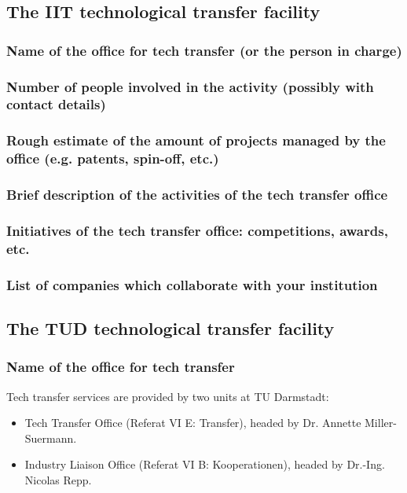 \documentclass[12pt,a4paper,twoside]{article}
\begin{document}
\subsection{The IIT technological transfer facility}

\subsubsection{Name of the office for tech transfer (or the person in charge)}
\subsubsection{Number of people involved in the activity (possibly with contact details)}
\subsubsection{Rough estimate of the amount of projects managed by the office (e.g. patents, spin-off, etc.)}
\subsubsection{Brief description of the activities of the tech transfer office}
\subsubsection{Initiatives of the tech transfer office: competitions, awards, etc.}
\subsubsection{List of companies which collaborate with your institution}

\subsection{The TUD technological transfer facility}

\subsubsection{Name of the office for tech transfer}
Tech transfer services are provided by two units at TU Darmstadt:
\begin{itemize}
\item Tech Transfer Office (Referat VI E: Transfer), headed by Dr. Annette Miller-Suermann.
\item Industry Liaison Office (Referat VI B: Kooperationen), headed by Dr.-Ing. Nicolas Repp.
\end{itemize}
\end{document}

